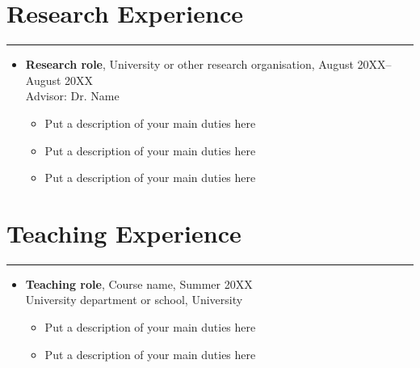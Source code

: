 \documentclass{article}
\begin{document}
\section*{Research Experience}
\hrule
\vspace{1em}
\begin{itemize}[leftmargin=*]

    \item \textbf{Research role}, University or other research organisation, August 20XX–August 20XX\\
    Advisor: Dr. Name
    \begin{itemize}
        \item Put a description of your main duties here
        \item Put a description of your main duties here
        \item Put a description of your main duties here
    \end{itemize}
\end{itemize}

\section*{Teaching Experience}
\hrule
\vspace{1em}
\begin{itemize}[leftmargin=*]
    \item \textbf{Teaching role}, Course name, Summer 20XX\\
    University department or school, University
    \begin{itemize}
        \item Put a description of your main duties here
        \item Put a description of your main duties here
    \end{itemize}
\end{itemize}

\end{document}
